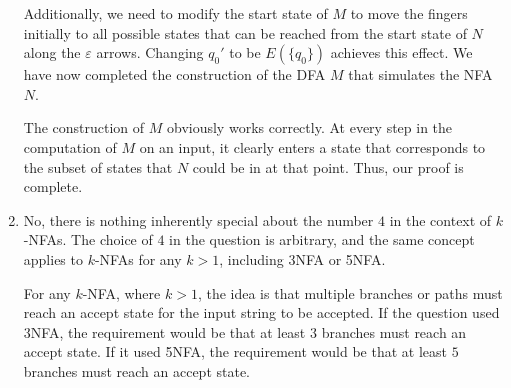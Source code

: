 \documentclass[letterpaper,12pt]{article}
\begin{document}
\begin{enumerate}
    Additionally, we need to modify the start state of \(M\) to move the fingers initially to all possible states that can be reached from the start state of \(N\) along the \(\varepsilon\) arrows. Changing \(q_0'\) to be \(E(\{q_0\})\) achieves this effect. We have now completed the construction of the DFA \(M\) that simulates the NFA \(N\).

    The construction of \(M\) obviously works correctly. At every step in the computation of \(M\) on an input, it clearly enters a state that corresponds to the subset of states that \(N\) could be in at that point. Thus, our proof is complete.

    \item No, there is nothing inherently special about the number $4$ in the context of \(k\)-NFAs. The choice of $4$ in the question is arbitrary, and the same concept applies to \(k\)-NFAs for any \(k > 1\), including 3NFA or 5NFA.
    
    For any \(k\)-NFA, where \(k > 1\), the idea is that multiple branches or paths must reach an accept state for the input string to be accepted. If the question used 3NFA, the requirement would be that at least $3$ branches must reach an accept state. If it used 5NFA, the requirement would be that at least $5$ branches must reach an accept state.



\end{enumerate}
\end{document}
